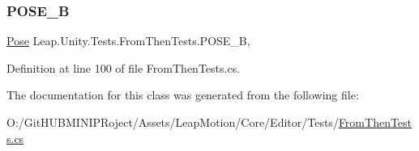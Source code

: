 \subsubsection{\texorpdfstring{POSE\_B}{POSE\_B}}
{\footnotesize\ttfamily \mbox{\hyperlink{struct_leap_1_1_unity_1_1_pose}{Pose}} Leap.\+Unity.\+Tests.\+From\+Then\+Tests.\+P\+O\+S\+E\+\_\+B\hspace{0.3cm}{\ttfamily [static]}, {\ttfamily [get]}}



Definition at line 100 of file From\+Then\+Tests.\+cs.



The documentation for this class was generated from the following file\+:\begin{DoxyCompactItemize}
\item 
O\+:/\+Git\+H\+U\+B\+M\+I\+N\+I\+P\+Roject/\+Assets/\+Leap\+Motion/\+Core/\+Editor/\+Tests/\mbox{\hyperlink{_from_then_tests_8cs}{From\+Then\+Tests.\+cs}}\end{DoxyCompactItemize}
